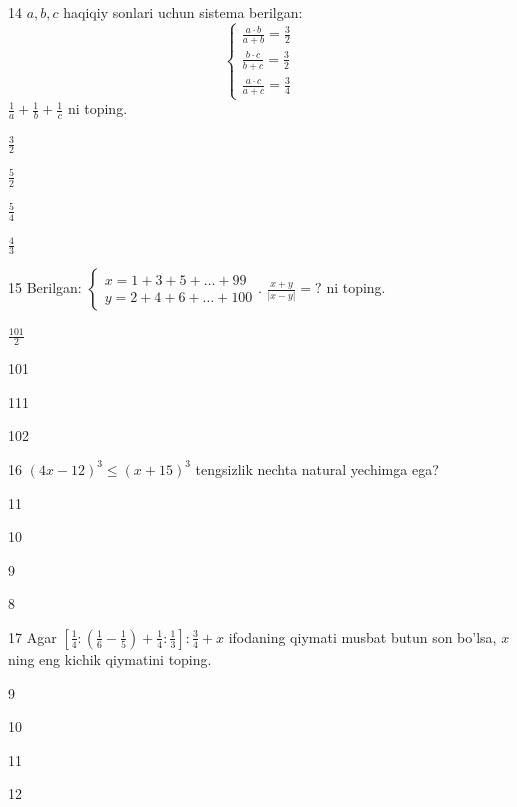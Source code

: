\documentclass[14pt]{article}
\begin{document}
\begin{questionbox}{14}
    \(a, b, c\) haqiqiy sonlari uchun sistema berilgan:
    \[
    \begin{cases} \frac{a \cdot b}{a+b} = \frac{3}{2} \\ \frac{b \cdot c}{b+c} = \frac{3}{2} \\ \frac{a \cdot c}{a+c} = \frac{3}{4} \end{cases}
    \]
    \(\frac{1}{a} + \frac{1}{b} + \frac{1}{c}\) ni toping.
    \begin{options}
        \item \(\frac{3}{2}\)
        \item \(\frac{5}{2}\)
        \item \(\frac{5}{4}\)
        \item \(\frac{4}{3}\)
    \end{options}
\end{questionbox}

\begin{questionbox}{15}
    Berilgan: \(\begin{cases} x = 1 + 3 + 5 + \dots + 99 \\ y = 2 + 4 + 6 + \dots + 100 \end{cases}\). \(\frac{x+y}{|x-y|} = ?\) ni toping.
    \begin{options}
        \item \(\frac{101}{2}\)
        \item 101
        \item 111
        \item 102
    \end{options}
\end{questionbox}

\begin{questionbox}{16}
    \((4x - 12)^3 \leq (x + 15)^3\) tengsizlik nechta natural yechimga ega?
    \begin{options}
        \item 11
        \item 10
        \item 9
        \item 8
    \end{options}
\end{questionbox}

\begin{questionbox}{17}
    Agar \(\left[\frac{1}{4} : \left(\frac{1}{6} - \frac{1}{5}\right) + \frac{1}{4} : \frac{1}{3}\right] : \frac{3}{4} + x\) ifodaning qiymati musbat butun son bo'lsa, \(x\) ning eng kichik qiymatini toping.
    \begin{options}
        \item 9
        \item 10
        \item 11
        \item 12
    \end{options}
\end{questionbox}
\end{document}
